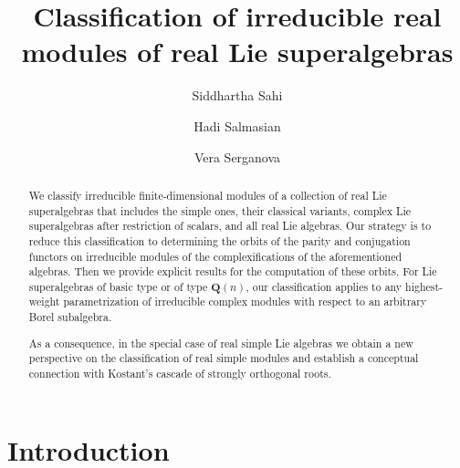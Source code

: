 \documentclass[12pt]{amsart}
\title[Real modules of real Lie superalgebras]{Classification of irreducible real modules of  real Lie superalgebras}
\begin{document}
\author{Siddhartha Sahi}
\address{Department of Mathematics,    
    Rutgers University,paper
    110 Frelinghuysen Rd, 
    Piscataway, NJ 08854-8019,
    USA
  }

  \author{Hadi Salmasian}

  \address{
Department of Mathematics and Statistics,
    University of Ottawa,
    585 King Edward Ave,
    Ottawa, Ontario,
    Canada K1N 6N5%
  }




\author{Vera Serganova}
\address{
Department of Mathematics,
    University of California at Berkeley,
    969 Evans Hall,
    Berkeley, CA 94720,
    USA
    } 








\maketitle

\begin{abstract}
We classify irreducible finite-dimensional modules of a collection of real Lie superalgebras that includes the simple ones, their classical variants, complex Lie superalgebras after restriction of scalars, and all real Lie algebras. 
Our strategy is to reduce this classification to determining the orbits of the parity and conjugation functors on  irreducible modules of the complexifications of the aforementioned algebras. Then we provide explicit results for the computation of these orbits.
 For Lie superalgebras of basic type or of type $\mathbf{Q}(n)$, our classification applies to any highest-weight parametrization of irreducible complex modules with respect to an arbitrary Borel subalgebra. 

As a consequence, in the special case of real simple Lie algebras we obtain  a new perspective on the classification  of real simple modules  and  establish a conceptual connection with Kostant’s cascade of strongly orthogonal roots.
\end{abstract}


\section{Introduction}
\end{document}
